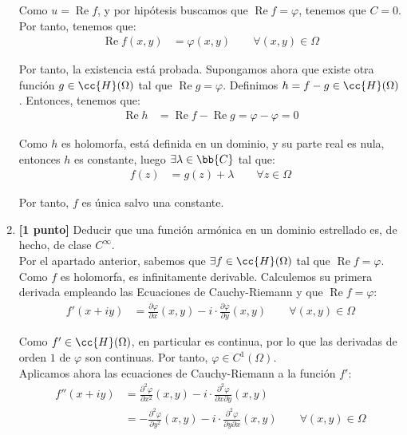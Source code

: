 \documentclass[12pt]{article}
\renewcommand{\Re}{\operatorname{Re}} %
\begin{document}
\begin{ejercicio}
\begin{enumerate}
        Como $u=\Re f$, y por hipótesis buscamos que $\Re f = \varphi$, tenemos que $C=0$. Por tanto, tenemos que:
        \begin{align*}
            \Re f(x,y) &= \varphi(x,y)\qquad \forall (x,y) \in \Omega
        \end{align*}


        Por tanto, la existencia está probada. Supongamos ahora que existe otra función $g\in \cc{H}(\Omega)$ tal que $\Re g = \varphi$. Definimos $h = f - g\in \cc{H}(\Omega)$. Entonces, tenemos que:
        \begin{align*}
            \Re h &= \Re f - \Re g = \varphi - \varphi = 0
        \end{align*}

        Como $h$ es holomorfa, está definida en un dominio, y su parte real es nula, entonces $h$ es constante, luego $\exists \lambda \in \bb{C}$ tal que:
        \begin{align*}
            f(z) &= g(z) + \lambda\qquad \forall z \in \Omega
        \end{align*}

        Por tanto, $f$ es única salvo una constante.

            \item \textbf{[1 punto]} Deducir que una función armónica en un dominio estrellado es, de hecho, de clase $C^{\infty}$.\\
            
            Por el apartado anterior, sabemos que $\exists f\in \cc{H}(\Omega)$ tal que $\Re f = \varphi$. Como $f$ es holomorfa, es infinitamente derivable. Calculemos su primera derivada empleando las Ecuaciones de Cauchy-Riemann y que $\Re f = \varphi$:
            \begin{align*}
                f'(x+iy) &= \frac{\partial \varphi}{\partial x}(x,y) - i\cdot \frac{\partial \varphi}{\partial y}(x,y)\qquad \forall (x,y) \in \Omega
            \end{align*}

            Como $f'\in \cc{H}(\Omega)$, en particular es continua, por lo que las derivadas de orden $1$ de $\varphi$ son continuas. Por tanto, $\varphi\in C^1(\Omega)$.\\

            Aplicamos ahora las ecuaciones de Cauchy-Riemann a la función $f'$:
            \begin{align*}
                f''(x+iy) &= \frac{\partial^2 \varphi}{\partial x^2}(x,y) - i\cdot \frac{\partial^2 \varphi}{\partial x \partial y}(x,y)\\
                &= -\frac{\partial^2 \varphi}{\partial y^2}(x,y) - i\cdot \frac{\partial^2 \varphi}{\partial y \partial x}(x,y)\qquad \forall (x,y) \in \Omega
            \end{align*}


\end{enumerate}
\end{ejercicio}
\end{document}
